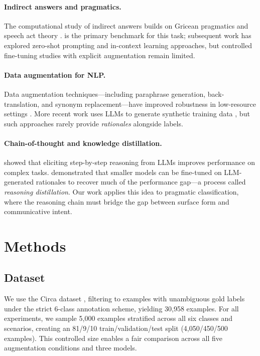 \documentclass[11pt,a4paper]{article}
\begin{document}
\paragraph{Indirect answers and pragmatics.}
The computational study of indirect answers builds on Gricean pragmatics \citep{grice1975logic} and speech act theory \citep{searle1969speech}. \citet{louis2020} is the primary benchmark for this task; subsequent work has explored zero-shot prompting \citep{gpt3} and in-context learning approaches, but controlled fine-tuning studies with explicit augmentation remain limited.

\paragraph{Data augmentation for NLP.}
Data augmentation techniques---including paraphrase generation, back-translation, and synonym replacement---have improved robustness in low-resource settings \citep{wei2019eda}. More recent work uses LLMs to generate synthetic training data \citep{moller2023prompt}, but such approaches rarely provide \textit{rationales} alongside labels.

\paragraph{Chain-of-thought and knowledge distillation.}
\citet{wei2022chain} showed that eliciting step-by-step reasoning from LLMs improves performance on complex tasks. \citet{hsieh2023distillation} demonstrated that smaller models can be fine-tuned on LLM-generated rationales to recover much of the performance gap---a process called \textit{reasoning distillation}. Our work applies this idea to pragmatic classification, where the reasoning chain must bridge the gap between surface form and communicative intent.

\section{Methods}

\subsection{Dataset}

We use the Circa dataset \citep{louis2020}, filtering to examples with unambiguous gold labels under the strict 6-class annotation scheme, yielding 30,958 examples. For all experiments, we sample 5,000 examples stratified across all six classes and scenarios, creating an 81/9/10 train/validation/test split (4,050/450/500 examples). This controlled size enables a fair comparison across all five augmentation conditions and three models.
\end{document}
